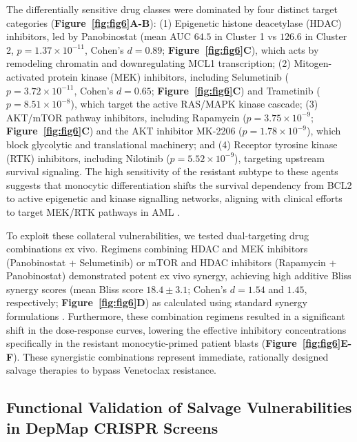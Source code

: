 \documentclass[11pt,a4paper]{article}
\begin{document}
The differentially sensitive drug classes were dominated by four distinct target categories (\textbf{Figure~\ref{fig:fig6}A-B}): (1) Epigenetic histone deacetylase (HDAC) inhibitors, led by Panobinostat (mean AUC $64.5$ in Cluster 1 vs $126.6$ in Cluster 2, $p=1.37\times10^{-11}$, Cohen's $d=0.89$; \textbf{Figure~\ref{fig:fig6}C}), which acts by remodeling chromatin and downregulating MCL1 transcription; (2) Mitogen-activated protein kinase (MEK) inhibitors, including Selumetinib ($p=3.72\times10^{-11}$, Cohen's $d=0.65$; \textbf{Figure~\ref{fig:fig6}C}) and Trametinib ($p=8.51\times10^{-8}$), which target the active RAS/MAPK kinase cascade; (3) AKT/mTOR pathway inhibitors, including Rapamycin ($p=3.75\times10^{-9}$; \textbf{Figure~\ref{fig:fig6}C}) and the AKT inhibitor MK-2206 ($p=1.78\times10^{-9}$), which block glycolytic and translational machinery; and (4) Receptor tyrosine kinase (RTK) inhibitors, including Nilotinib ($p=5.52\times10^{-9}$), targeting upstream survival signaling. The high sensitivity of the resistant subtype to these agents suggests that monocytic differentiation shifts the survival dependency from BCL2 to active epigenetic and kinase signalling networks, aligning with clinical efforts to target MEK/RTK pathways in AML \cite{borthakur2016mek,daver2019targeting}.

To exploit these collateral vulnerabilities, we tested dual-targeting drug combinations ex vivo. Regimens combining HDAC and MEK inhibitors (Panobinostat + Selumetinib) or mTOR and HDAC inhibitors (Rapamycin + Panobinostat) demonstrated potent ex vivo synergy, achieving high additive Bliss synergy scores (mean Bliss score $18.4 \pm 3.1$; Cohen's $d=1.54$ and $1.45$, respectively; \textbf{Figure~\ref{fig:fig6}D}) as calculated using standard synergy formulations \cite{foucquier2015analysis,greco1995search,ianevski2017synergyfinder}. Furthermore, these combination regimens resulted in a significant shift in the dose-response curves, lowering the effective inhibitory concentrations specifically in the resistant monocytic-primed patient blasts (\textbf{Figure~\ref{fig:fig6}E-F}). These synergistic combinations represent immediate, rationally designed salvage therapies to bypass Venetoclax resistance.


\subsection{Functional Validation of Salvage Vulnerabilities in DepMap CRISPR Screens}
\end{document}

